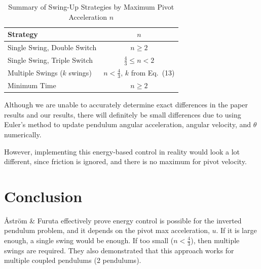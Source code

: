 \documentclass{article}
\begin{document}
\begin{table}[ht]
  \centering
  \caption{Summary of Swing-Up Strategies by Maximum Pivot Acceleration $n$}
  \label{tab:summary}
  \begin{tabular}{|l|c|}
    \hline
    Strategy & $n$ \\
    \hline
    Single Swing, Double Switch & $n \geq 2$ \\
    Single Swing, Triple Switch & $\frac{4}{3} \leq n < 2$ \\
    Multiple Swings ($k$ swings) & $n < \frac{4}{3}$, $k$ from Eq.~(13) \\
    Minimum Time & $n \geq 2$ \\
    \hline
  \end{tabular}
\end{table}

Although we are unable to accurately determine exact differences in the paper results and our results, there will definitely be small differences due to using Euler's method to update pendulum angular acceleration, angular velocity, and $\theta$ numerically.

However, implementing this energy-based control in reality would look a lot different, since friction is ignored, and there is no maximum for pivot velocity.


\section{Conclusion}
Åström \& Furuta effectively prove energy control is possible for the inverted pendulum problem, and it depends on the pivot max acceleration, $u$. If it is large enough, a single swing would be enough. If too small ($n< \frac{4}{3}$), then multiple swings are required. They also demonstrated that this approach works for multiple coupled pendulums (2 pendulums).



\end{document}

